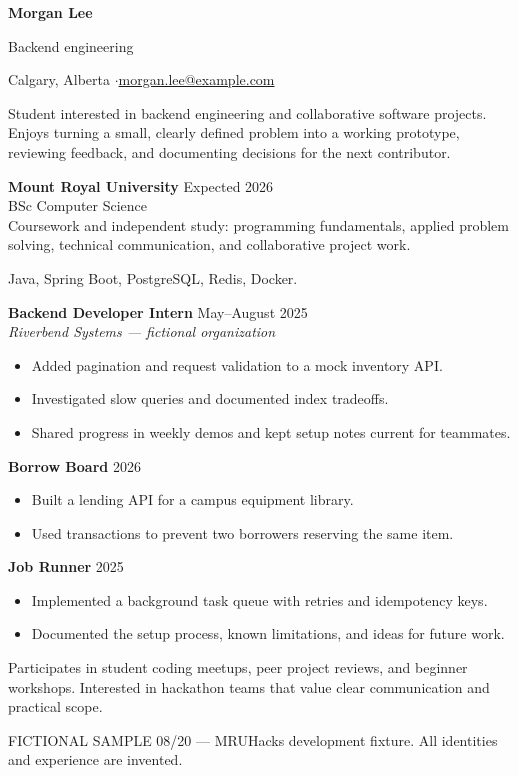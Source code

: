 
{\Huge\bfseries Morgan Lee}\par
{\large\color{accent} Backend engineering}\par
Calgary, Alberta \enspace$\cdot$\enspace \href{mailto:morgan.lee@example.com}{morgan.lee@example.com}

Student interested in backend engineering and collaborative software projects.
Enjoys turning a small, clearly defined problem into a working prototype,
reviewing feedback, and documenting decisions for the next contributor.

\textbf{Mount Royal University} \hfill Expected 2026\\
BSc Computer Science\\
Coursework and independent study: programming fundamentals, applied problem solving,
technical communication, and collaborative project work.

Java, Spring Boot, PostgreSQL, Redis, Docker.

\textbf{Backend Developer Intern} \hfill May--August 2025\\
\textit{Riverbend Systems --- fictional organization}
\begin{itemize}
\item Added pagination and request validation to a mock inventory API.
\item Investigated slow queries and documented index tradeoffs.
\item Shared progress in weekly demos and kept setup notes current for teammates.
\end{itemize}

\textbf{Borrow Board} \hfill 2026
\begin{itemize}
\item Built a lending API for a campus equipment library.
\item Used transactions to prevent two borrowers reserving the same item.
\end{itemize}
\textbf{Job Runner} \hfill 2025
\begin{itemize}
\item Implemented a background task queue with retries and idempotency keys.
\item Documented the setup process, known limitations, and ideas for future work.
\end{itemize}

Participates in student coding meetups, peer project reviews, and beginner workshops.
Interested in hackathon teams that value clear communication and practical scope.

\vfill
{\footnotesize\color{gray} FICTIONAL SAMPLE 08/20 --- MRUHacks development fixture.
All identities and experience are invented.}

